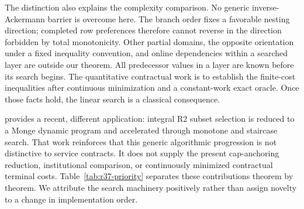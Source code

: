 The distinction also explains the complexity comparison. No generic inverse-Ackermann barrier is overcome here. The branch order fixes a favorable nesting direction; completed row preferences therefore cannot reverse in the direction forbidden by total monotonicity. Other partial domains, the opposite orientation under a fixed inequality convention, and online dependencies within a searched layer are outside our theorem. All predecessor values in a layer are known before its search begins. The quantitative contractual work is to establish the finite-cost inequalities after continuous minimization and a constant-work exact oracle. Once those facts hold, the linear search is a classical consequence.

\citet{Emmerich2026} provides a recent, different application: integral R2 subset selection is reduced to a Monge dynamic program and accelerated through monotone and staircase search. That work reinforces that this generic algorithmic progression is not distinctive to service contracts. It does not supply the present cap-anchoring reduction, institutional comparison, or continuously minimized contractual terminal costs. Table~\ref{tab:r37-priority} separates these contributions theorem by theorem. We attribute the search machinery positively rather than assign novelty to a change in implementation order.
